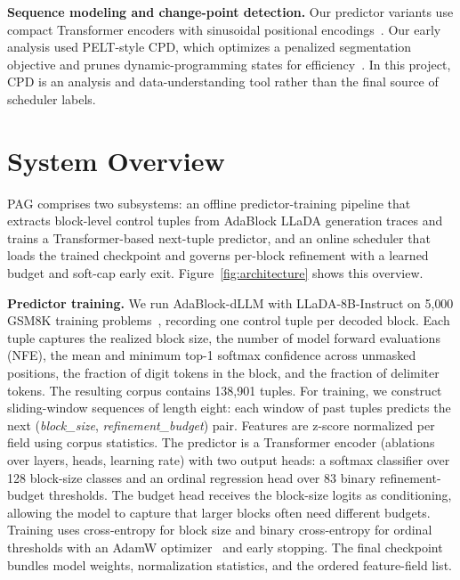 \documentclass[11pt]{article}
\begin{document}
\textbf{Sequence modeling and change-point detection.} Our predictor variants use compact Transformer encoders with sinusoidal positional encodings~\citep{vaswani2017attention}. Our early analysis used PELT-style CPD, which optimizes a penalized segmentation objective and prunes dynamic-programming states for efficiency~\citep{killick2012optimal}. In this project, CPD is an analysis and data-understanding tool rather than the final source of scheduler labels.

\section{System Overview}

PAG comprises two subsystems: an offline predictor-training pipeline that extracts block-level control tuples from AdaBlock LLaDA generation traces and trains a Transformer-based next-tuple predictor, and an online scheduler that loads the trained checkpoint and governs per-block refinement with a learned budget and soft-cap early exit.
Figure~\ref{fig:architecture} shows this overview.

\textbf{Predictor training.} We run AdaBlock-dLLM with LLaDA-8B-Instruct on 5{,}000 GSM8K training problems~\citep{cobbe2021gsm8k}, recording one control tuple per decoded block. 
Each tuple captures the realized block size, the number of model forward evaluations (NFE), the mean and minimum top-1 softmax confidence across unmasked positions, the fraction of digit tokens in the block, and the fraction of delimiter tokens. 
The resulting corpus contains 138{,}901 tuples. For training, we construct sliding-window sequences of length eight: each window of past tuples predicts the next (\textit{block\_size}, \textit{refinement\_budget}) pair. 
Features are z-score normalized per field using corpus statistics. The predictor is a Transformer encoder (ablations over layers, heads, learning rate) with two output heads: a softmax classifier over 128 block-size classes and an ordinal regression head over 83 binary refinement-budget thresholds.
The budget head receives the block-size logits as conditioning, allowing the model to capture that larger blocks often need different budgets. 
Training uses cross-entropy for block size and binary cross-entropy for ordinal thresholds with an AdamW optimizer~\citep{loshchilov2019adamw} and early stopping. 
The final checkpoint bundles model weights, normalization statistics, and the ordered feature-field list.
\end{document}
